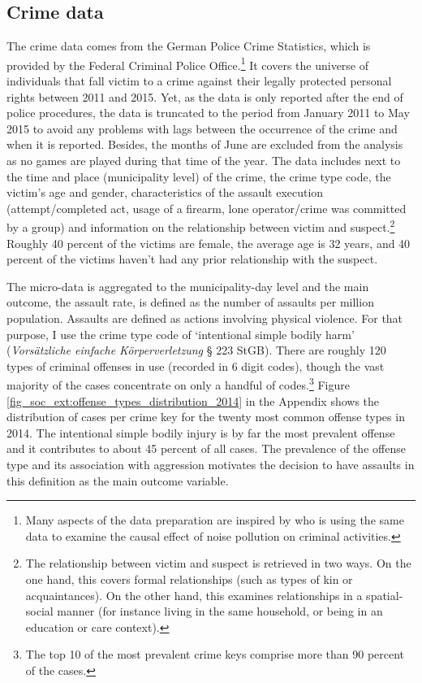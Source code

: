 \subsection{Crime data}
The crime data comes from the German Police Crime Statistics, which is provided by the Federal Criminal Police Office.\footnote{Many aspects of the data preparation are inspired by \cite{hener2019noise} who is using the same data to examine the causal effect of noise pollution on criminal activities.} It covers the universe of individuals that fall victim to a crime against their legally protected personal rights between 2011 and 2015. Yet, as the data is only reported after the end of police procedures, the data is truncated to the period from January 2011 to May 2015 to avoid any problems with lags between the occurrence of the crime and when it is reported. Besides, the months of June are excluded from the analysis as no games are played during that time of the year. The data includes next to the time and place (municipality level) of the crime, the crime type code, the victim's age and gender, characteristics of the assault execution (attempt/completed act, usage of a firearm, lone operator/crime was committed by a group) and information on the relationship between victim and suspect.\footnote{The relationship between victim and suspect is retrieved in two ways. On the one hand, this covers formal relationships (such as types of kin or acquaintances). On the other hand, this examines relationships in a spatial-social manner (for instance living in the same household, or being in an education or care context).} Roughly 40 percent of the victims are female, the average age is 32 years, and 40 percent of the victims haven't had any prior relationship with the suspect.




The micro-data is aggregated to the municipality-day level and the main outcome, the assault rate, is defined as the number of assaults per million population. Assaults are defined as actions involving physical violence. For that purpose, I use the crime type code of `intentional simple bodily harm' (\textit{Vorsätzliche einfache Körperverletzung} § 223 StGB). There are roughly 120 types of criminal offenses in use (recorded in 6 digit codes), though the vast majority of the cases concentrate on only a handful of codes.\footnote{The top 10 of the most prevalent crime keys comprise more than 90 percent of the cases.} Figure \ref{fig_soc_ext:offense_types_distribution_2014} in the Appendix shows the distribution of cases per crime key for the twenty most common offense types in 2014. The intentional simple bodily injury is by far the most prevalent offense and it contributes to about 45 percent of all cases. The prevalence of the offense type and its association with aggression motivates the decision to have assaults in this definition as the main outcome variable.

